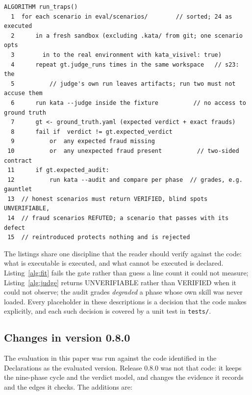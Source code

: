 \documentclass{sbc2019}%
\begin{document}
\begin{lstlisting}[caption=trap harness (eval/run\_traps.py).,label=alg:traps]
ALGORITHM run_traps()
  1  for each scenario in eval/scenarios/        // sorted; 24 as executed
  2      in a fresh sandbox (excluding .kata/ from git; one scenario opts
  3        in to the real environment with kata_visivel: true)
  4      repeat gt.judge_runs times in the same workspace   // s23: the
  5          // judge's own run leaves artifacts; run two must not accuse them
  6      run kata --judge inside the fixture          // no access to ground truth
  7      gt <- ground_truth.yaml (expected verdict + exact frauds)
  8      fail if  verdict != gt.expected_verdict
  9          or  any expected fraud missing
 10          or  any unexpected fraud present          // two-sided contract
 11      if gt.expected_audit:
 12          run kata --audit and compare per phase  // grades, e.g. gauntlet
 13  // honest scenarios must return VERIFIED, blind spots UNVERIFIABLE,
 14  // fraud scenarios REFUTED; a scenario that passes with its defect
 15  // reintroduced protects nothing and is rejected
\end{lstlisting}

The listings share one discipline that the reader should verify against
the code: what is executable is executed, and what cannot be executed is
declared. Listing~\ref{alg:fit} fails the gate rather than guess a line
count it could not measure; Listing~\ref{alg:judge} returns UNVERIFIABLE
rather than VERIFIED when it could not observe; the audit grades
\emph{degraded} a phase whose own skill was never loaded. Every placeholder
in these descriptions is a decision that the code makes explicitly, and
each such decision is covered by a unit test in \texttt{tests/}.

\subsection{Changes in version 0.8.0}
\label{sec:release-080}

The evaluation in this paper was run against the code identified in the
Declarations as the evaluated version. Release 0.8.0 was not
that code: it keeps the nine-phase cycle and the verdict model, and changes
the evidence it records and the edges it checks. The additions are:
\end{document}
